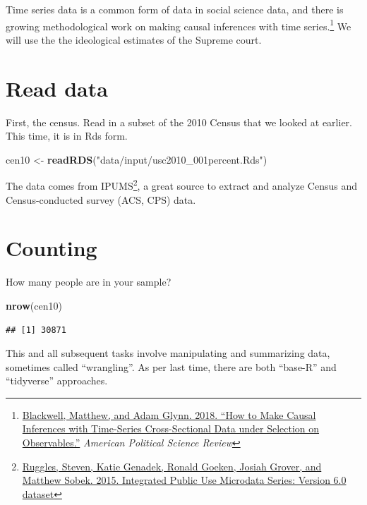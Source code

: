 \documentclass[]{book}
\newenvironment{Shaded}{\begin{snugshade}}{\end{snugshade}}
\newcommand{\KeywordTok}[1]{\textcolor[rgb]{0.13,0.29,0.53}{\textbf{#1}}}
\newcommand{\StringTok}[1]{\textcolor[rgb]{0.31,0.60,0.02}{#1}}
\newcommand{\NormalTok}[1]{#1}
\let\rmarkdownfootnote\footnote%
\def\footnote{\protect\rmarkdownfootnote}
\theoremstyle{definition}
\theoremstyle{definition}
\theoremstyle{definition}
\theoremstyle{remark}
\begin{document}
Time series data is a common form of data in social science data, and
there is growing methodological work on making causal inferences with
time series.\footnote{\href{https://doi.org/10.1017/S0003055418000357}{Blackwell,
  Matthew, and Adam Glynn. 2018. ``How to Make Causal Inferences with
  Time-Series Cross-Sectional Data under Selection on Observables.''}
  \emph{American Political Science Review}} We will use the the
ideological estimates of the Supreme court.

\section{Read data}\label{read-data-2}

First, the census. Read in a subset of the 2010 Census that we looked at
earlier. This time, it is in Rds form.

\begin{Shaded}
\begin{Highlighting}[]
\NormalTok{cen10 <-}\StringTok{ }\KeywordTok{readRDS}\NormalTok{(}\StringTok{"data/input/usc2010_001percent.Rds"}\NormalTok{)}
\end{Highlighting}
\end{Shaded}

The data comes from IPUMS\footnote{\href{http://doi.org/10.18128/D010.V6.0}{Ruggles,
  Steven, Katie Genadek, Ronald Goeken, Josiah Grover, and Matthew
  Sobek. 2015. Integrated Public Use Microdata Series: Version 6.0
  dataset}}, a great source to extract and analyze Census and
Census-conducted survey (ACS, CPS) data.

\section{Counting}\label{counting}

How many people are in your sample?

\begin{Shaded}
\begin{Highlighting}[]
\KeywordTok{nrow}\NormalTok{(cen10)}
\end{Highlighting}
\end{Shaded}

\begin{verbatim}
## [1] 30871
\end{verbatim}

This and all subsequent tasks involve manipulating and summarizing data,
sometimes called ``wrangling''. As per last time, there are both
``base-R'' and ``tidyverse'' approaches.
\end{document}
